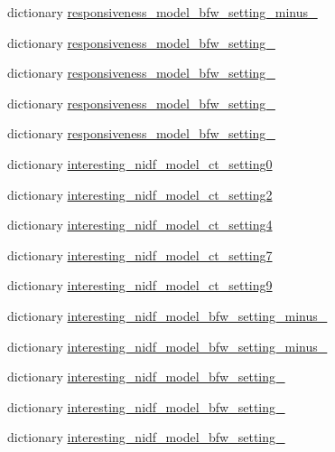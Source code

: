 \begin{DoxyCompactItemize}
dictionary \hyperlink{namespacemturk_1_1model__configs_a1eb7adcca60944926e9867051c3121b6}{responsiveness\+\_\+model\+\_\+bfw\+\_\+setting\+\_\+minus\+\_}
\item 
dictionary \hyperlink{namespacemturk_1_1model__configs_af1125670130d68ed01f999d051a4bc5f}{responsiveness\+\_\+model\+\_\+bfw\+\_\+setting\+\_}
\item 
dictionary \hyperlink{namespacemturk_1_1model__configs_a1c46c269c1d8c50c6dd4a85417a41f91}{responsiveness\+\_\+model\+\_\+bfw\+\_\+setting\+\_}
\item 
dictionary \hyperlink{namespacemturk_1_1model__configs_aefb1203efff3c622d1d9c0302abd63a8}{responsiveness\+\_\+model\+\_\+bfw\+\_\+setting\+\_}
\item 
dictionary \hyperlink{namespacemturk_1_1model__configs_aef1c5f9d24acd20446c2767027358ea4}{responsiveness\+\_\+model\+\_\+bfw\+\_\+setting\+\_}
\item 
dictionary \hyperlink{namespacemturk_1_1model__configs_a367f6f7e45eb74303a294767ea4818fa}{interesting\+\_\+nidf\+\_\+model\+\_\+ct\+\_\+setting0}
\item 
dictionary \hyperlink{namespacemturk_1_1model__configs_acbf605fec76321449d7cd6d0ce5ea2ec}{interesting\+\_\+nidf\+\_\+model\+\_\+ct\+\_\+setting2}
\item 
dictionary \hyperlink{namespacemturk_1_1model__configs_a2f72f4d5fee474c4b69999d86d60b915}{interesting\+\_\+nidf\+\_\+model\+\_\+ct\+\_\+setting4}
\item 
dictionary \hyperlink{namespacemturk_1_1model__configs_aefaf61e336a323ef4ae389dbd5f2426e}{interesting\+\_\+nidf\+\_\+model\+\_\+ct\+\_\+setting7}
\item 
dictionary \hyperlink{namespacemturk_1_1model__configs_a5064140f9f584dcc902a9840c915950c}{interesting\+\_\+nidf\+\_\+model\+\_\+ct\+\_\+setting9}
\item 
dictionary \hyperlink{namespacemturk_1_1model__configs_a2e95536bddece884daf708e72dcbd8ac}{interesting\+\_\+nidf\+\_\+model\+\_\+bfw\+\_\+setting\+\_\+minus\+\_}
\item 
dictionary \hyperlink{namespacemturk_1_1model__configs_a1980ec7eac9393e23168e215731f1597}{interesting\+\_\+nidf\+\_\+model\+\_\+bfw\+\_\+setting\+\_\+minus\+\_}
\item 
dictionary \hyperlink{namespacemturk_1_1model__configs_a71392e8c79c0244635db30b384856bf9}{interesting\+\_\+nidf\+\_\+model\+\_\+bfw\+\_\+setting\+\_}
\item 
dictionary \hyperlink{namespacemturk_1_1model__configs_abf41a8a317edc6c160bee0cbe1cd16dd}{interesting\+\_\+nidf\+\_\+model\+\_\+bfw\+\_\+setting\+\_}
\item 
dictionary \hyperlink{namespacemturk_1_1model__configs_a41f24e3164eb9a079e563da8b0396348}{interesting\+\_\+nidf\+\_\+model\+\_\+bfw\+\_\+setting\+\_}
\end{DoxyCompactItemize}


